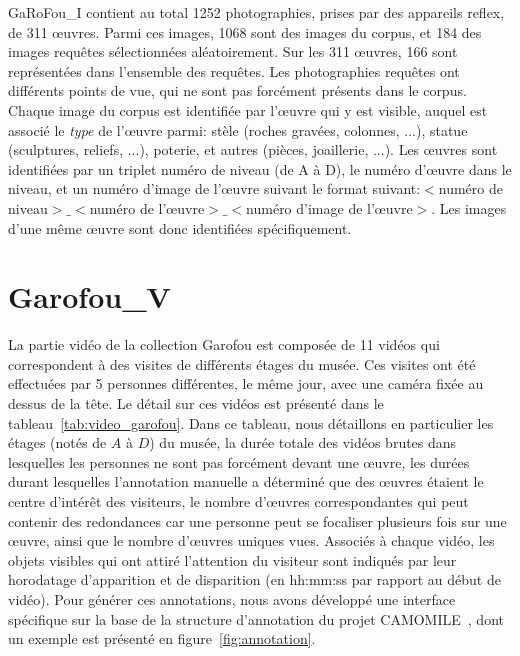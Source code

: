 GaRoFou\_I contient au total 1252 photographies, prises par des appareils reflex, de 311 œuvres. Parmi ces images, 1068 sont des images du corpus, et 184 des images requêtes sélectionnées aléatoirement. Sur les 311 œuvres, 166 sont représentées dans l'ensemble des requêtes. Les photographies requêtes ont différents points de vue, qui ne sont pas forcément présents dans le corpus. Chaque image du corpus est identifiée par l'œuvre qui y est visible, auquel est associé le {\it type} de l'œuvre parmi: stèle (roches gravées, colonnes, ...), statue (sculptures, reliefs, ...), poterie, et autres (pièces, joaillerie, ...). Les œuvres sont identifiées par un triplet numéro de niveau (de A à D), le numéro d'œuvre dans le niveau, et un numéro d'image de l'œuvre suivant le format suivant:$<$numéro de niveau$>$$\_$$<$numéro de l'œuvre$>$$\_$$<$numéro d'image de l'œuvre$>$. Les images d'une même œuvre sont donc identifiées spécifiquement. 

\section{Garofou\_V}
\label{sec:garoufouv}

La partie vidéo de la collection Garofou est composée de 11 vidéos qui correspondent à des visites de différents étages du musée. Ces visites ont été effectuées par 5 personnes différentes, le même jour, avec une caméra fixée au dessus de la tête. Le détail sur ces vidéos est présenté dans le tableau~\ref{tab:video_garofou}. Dans ce tableau, nous détaillons en particulier les étages (notés de $A$ à $D$) du musée, la durée totale des vidéos brutes dans lesquelles les personnes ne sont pas forcément devant une œuvre, les durées durant lesquelles l'annotation manuelle a déterminé que des œuvres étaient le centre d'intérêt des visiteurs, le nombre d'œuvres correspondantes qui peut contenir des redondances car une personne peut se focaliser plusieurs fois sur une œuvre, ainsi que le nombre d'œuvres uniques vues.
Associés à chaque vidéo, les objets visibles qui ont attiré l'attention du visiteur sont indiqués par leur horodatage d'apparition et de disparition (en {hh:mm:ss} par rapport au début de vidéo). Pour générer ces annotations, nous avons développé une interface spécifique sur la base de la structure d'annotation du projet CAMOMILE~\cite{poignant2016camomile}, dont un exemple est présenté en figure~\ref{fig:annotation}.

